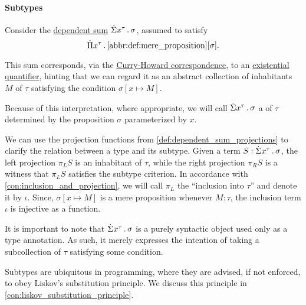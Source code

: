 \paragraph{Subtypes}

\begin{definition}\label{def:subtype}
  Consider the \hyperref[def:dependent_sum]{dependent sum} \( \qsum {x^\tau} \sigma \), assumed to satisfy
  \begin{equation}\label{eq:def:subtype}
    \qprod {x^\tau} \ref{abbr:def:mere_proposition}[\sigma].
  \end{equation}

  This sum corresponds, via the \hyperref[con:curry_howard_correspondence]{Curry-Howard correspondence}, to an \hyperref[def:first_order_language/quantifiers]{existential quantifier}, hinting that we can regard it as an abstract collection of inhabitants \( M \) of \( \tau \) satisfying the condition \( \sigma[x \mapsto M] \).

  Because of this interpretation, where appropriate, we will call \( \qsum {x^\tau} \sigma \) a  of \( \tau \) determined by the proposition \( \sigma \) parameterized by \( x \).

  We can use the projection functions from \cref{def:dependent_sum_projections} to clarify the relation between a type and its subtype. Given a term \( S: \qsum {x^\tau} \sigma \), the left projection \( \pi_L S \) is an inhabitant of \( \tau \), while the right projection \( \pi_R S \) is a witness that \( \pi_L S \) satisfies the subtype criterion. In accordance with \cref{con:inclusion_and_projection}, we will call \( \pi_L \) the \enquote{inclusion into \( \tau \)} and denote it by \( \iota \). Since, \( \sigma[x \mapsto M] \) is a mere proposition whenever \( M: \tau \), the inclusion term \( \iota \) is injective as a function.
\end{definition}
\begin{comments}
  \item It is important to note that \( \qsum {x^\tau} \sigma \) is a purely syntactic object used only as a type annotation. As such, it merely expresses the intention of taking a subcollection of \( \tau \) satisfying some condition.

  \item Subtypes are ubiquitous in programming, where they are advised, if not enforced, to obey Liskov's substitution principle. We discuss this principle in \cref{con:liskov_substitution_principle}.
\end{comments}

